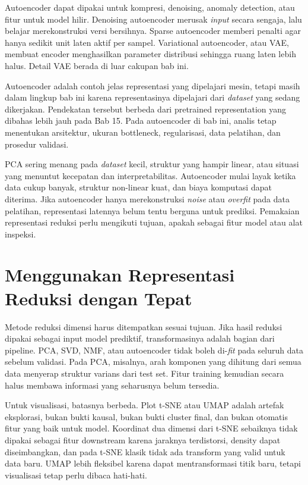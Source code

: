 Autoencoder dapat dipakai untuk kompresi, denoising, anomaly detection, atau fitur untuk model hilir. Denoising autoencoder merusak \emph{input} secara sengaja, lalu belajar merekonstruksi versi bersihnya. Sparse autoencoder memberi penalti agar hanya sedikit unit laten aktif per sampel. Variational autoencoder, atau VAE, membuat encoder menghasilkan parameter distribusi sehingga ruang laten lebih halus. Detail VAE berada di luar cakupan bab ini.

Autoencoder adalah contoh jelas representasi yang dipelajari mesin, tetapi masih dalam lingkup bab ini karena representasinya dipelajari dari \emph{dataset} yang sedang dikerjakan. Pendekatan tersebut berbeda dari pretrained representation yang dibahas lebih jauh pada Bab 15. Pada autoencoder di bab ini, analis tetap menentukan arsitektur, ukuran bottleneck, regularisasi, data pelatihan, dan prosedur validasi.

PCA sering menang pada \emph{dataset} kecil, struktur yang hampir linear, atau situasi yang menuntut kecepatan dan interpretabilitas. Autoencoder mulai layak ketika data cukup banyak, struktur non-linear kuat, dan biaya komputasi dapat diterima. Jika autoencoder hanya merekonstruksi \emph{noise} atau \emph{overfit} pada data pelatihan, representasi latennya belum tentu berguna untuk prediksi. Pemakaian representasi reduksi perlu mengikuti tujuan, apakah sebagai fitur model atau alat inspeksi.

\section{Menggunakan Representasi Reduksi dengan Tepat}\label{menggunakan-representasi-reduksi-dengan-tepat}

Metode reduksi dimensi harus ditempatkan sesuai tujuan. Jika hasil reduksi dipakai sebagai input model prediktif, transformasinya adalah bagian dari pipeline. PCA, SVD, NMF, atau autoencoder tidak boleh di-\emph{fit} pada seluruh data sebelum validasi. Pada PCA, misalnya, arah komponen yang dihitung dari semua data menyerap struktur varians dari test set. Fitur training kemudian secara halus membawa informasi yang seharusnya belum tersedia.

Untuk visualisasi, batasnya berbeda. Plot t-SNE atau UMAP adalah artefak eksplorasi, bukan bukti kausal, bukan bukti cluster final, dan bukan otomatis fitur yang baik untuk model. Koordinat dua dimensi dari t-SNE sebaiknya tidak dipakai sebagai fitur downstream karena jaraknya terdistorsi, density dapat diseimbangkan, dan pada t-SNE klasik tidak ada transform yang valid untuk data baru. UMAP lebih fleksibel karena dapat mentransformasi titik baru, tetapi visualisasi tetap perlu dibaca hati-hati.

